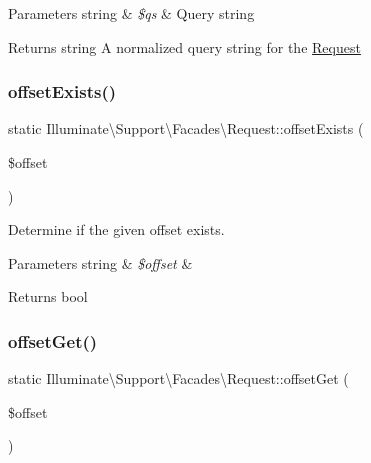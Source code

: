 \begin{DoxyParams}[1]{Parameters}
string & {\em \$qs} & Query string \\
\hline
\end{DoxyParams}
\begin{DoxyReturn}{Returns}
string A normalized query string for the \mbox{\hyperlink{class_illuminate_1_1_support_1_1_facades_1_1_request}{Request}} 
\end{DoxyReturn}
\mbox{\label{class_illuminate_1_1_support_1_1_facades_1_1_request_a846e51a1bad906d0b7dc34149d24b5da}} 
\subsubsection{\texorpdfstring{offset\+Exists()}{offsetExists()}}
{\footnotesize\ttfamily static Illuminate\textbackslash{}\+Support\textbackslash{}\+Facades\textbackslash{}\+Request\+::offset\+Exists (\begin{DoxyParamCaption}\item[{}]{\$offset }\end{DoxyParamCaption})\hspace{0.3cm}{\ttfamily [static]}}

Determine if the given offset exists.


\begin{DoxyParams}[1]{Parameters}
string & {\em \$offset} & \\
\hline
\end{DoxyParams}
\begin{DoxyReturn}{Returns}
bool 
\end{DoxyReturn}
\mbox{\label{class_illuminate_1_1_support_1_1_facades_1_1_request_a5e9324bd92c95487e0e2d4c9e2fac814}} 
\subsubsection{\texorpdfstring{offset\+Get()}{offsetGet()}}
{\footnotesize\ttfamily static Illuminate\textbackslash{}\+Support\textbackslash{}\+Facades\textbackslash{}\+Request\+::offset\+Get (\begin{DoxyParamCaption}\item[{}]{\$offset }\end{DoxyParamCaption})\hspace{0.3cm}{\ttfamily [static]}}

